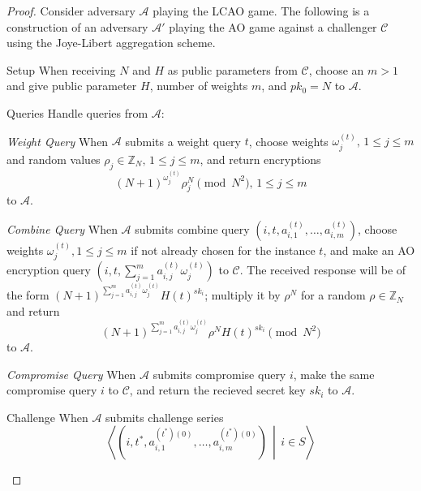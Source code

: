 \documentclass[10pt,letterpaper,oneside,twocolumn,journal]{IEEEtran}
\theoremstyle{definition}
\theoremstyle{definition}
\theoremstyle{remark}
\begin{document}
\begin{proof}
    Consider adversary $\mathcal{A}$ playing the LCAO game. The following is a construction of an adversary $\mathcal{A}'$ playing the AO game \cite{shiPrivacyPreservingAggregationTimeSeries2011} against a challenger $\mathcal{C}$ using the Joye-Libert aggregation scheme.
    \begin{LaTeXdescription}
        \item[Setup] When receiving $N$ and $H$ as public parameters from $\mathcal{C}$, choose an $m>1$ and give public parameter $H$, number of weights $m$, and $pk_0=N$ to $\mathcal{A}$.
        \item[Queries] Handle queries from $\mathcal{A}$:
        \begin{LaTeXdescription}
            \item[\textit{Weight Query}] When $\mathcal{A}$ submits a weight query $t$, choose weights $\omega^{(t)}_j,\,1 \leq j \leq m$ and random values $\rho_j \in \mathbb{Z}_N,\,1 \leq j \leq m$, and return encryptions 
            \begin{equation*}
                (N+1)^{\omega^{(t)}_{j}}\rho_j^N\pmod{N^2},\,1\leq j\leq m
            \end{equation*}
            to $\mathcal{A}$.
            \item[\textit{Combine Query}] When $\mathcal{A}$ submits combine query $(i, t, a^{(t)}_{i,1},\dots,a^{(t)}_{i,m})$, choose weights $\omega^{(t)}_j,1 \leq j \leq m$ if not already chosen for the instance $t$, and make an AO encryption query $(i, t, \sum^m_{j=1}a^{(t)}_{i,j}\omega^{(t)}_j)$ to $\mathcal{C}$. The received response will be of the form $(N+1)^{\sum^m_{j=1}a^{(t)}_{i,j}\omega^{(t)}_j}H(t)^{sk_i}$; multiply it by $\rho^N$ for a random $\rho \in \mathbb{Z}_N$ and return 
            \begin{equation*}
                (N+1)^{\sum^m_{j=1}a^{(t)}_{i,j}\omega^{(t)}_j}\rho^N H(t)^{sk_i} \pmod{N^2}
            \end{equation*}
            to $\mathcal{A}$.
            \item[\textit{Compromise Query}] When $\mathcal{A}$ submits compromise query $i$, make the same compromise query $i$ to $\mathcal{C}$, and return the recieved secret key $sk_i$ to $\mathcal{A}$.
        \end{LaTeXdescription}
        \item[Challenge] When $\mathcal{A}$ submits challenge series
        \begin{equation*}
            \left\langle\left(i,t^*,a^{(t^*)(0)}_{i,1},\dots,a^{(t^*)(0)}_{i,m}\right)\,\middle|\,i \in S\right\rangle

\end{equation*}
\end{LaTeXdescription}
\end{proof}
\end{document}
